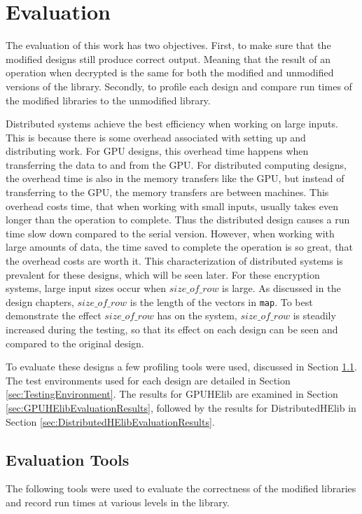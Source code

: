 \chapter{Evaluation} \label{chap:Evaluation}
The evaluation of this work has two objectives. First, to make sure that the modified designs still produce correct output. Meaning that the result of an operation when decrypted is the same for both the modified and unmodified versions of the library. Secondly, to profile each design and compare run times of the modified libraries to the unmodified library. 

Distributed systems achieve the best efficiency when working on large inputs. This is because there is some overhead associated with setting up and distributing work. For GPU designs, this overhead time happens when transferring the data to and from the GPU. For distributed computing designs, the overhead time is also in the memory transfers like the GPU, but instead of transferring to the GPU, the memory transfers are between machines. This overhead costs time, that when working with small inputs, usually takes even longer than the operation to complete. Thus the distributed design causes a run time slow down compared to the serial version. However, when working with large amounts of data, the time saved to complete the operation is so great, that the overhead costs are worth it. This characterization of distributed systems is prevalent for these designs, which will be seen later. For these encryption systems, large input sizes occur when $size\_of\_row$ is large. As discussed in the design chapters, $size\_of\_row$ is the length of the vectors in \verb|map|. To best demonstrate the effect $size\_of\_row$ has on the system, $size\_of\_row$ is steadily increased during the testing, so that its effect on each design can be seen and compared to the original design.

To evaluate these designs a few profiling tools were used, discussed in Section \ref{sec:EvaluationTools}. The test environments used for each design are detailed in Section \ref{sec:TestingEnvironment}. The results for GPUHElib are examined in Section \ref{sec:GPUHElibEvaluationResults}, followed by the results for DistributedHElib in Section \ref{sec:DistributedHElibEvaluationResults}.

\section{Evaluation Tools} \label{sec:EvaluationTools}
The following tools were used to evaluate the correctness of the modified libraries and record run times at various levels in the library.

